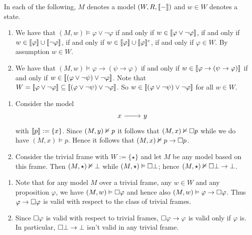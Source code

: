 \documentclass{article}
\begin{document}
\maketitle

\begin{ex}
In each of the following, $M$ denotes a model $(W,R,\llbracket{-}\rrbracket)$ and $w\in W$
denotes a state.
\begin{enumerate} 
\item We have that $(M,w)\models \varphi\lor\neg\varphi$ if and only if $w\in \llbracket\varphi\lor
\neg\varphi\rrbracket$, if and only if $w\in \llbracket\varphi\rrbracket\cup\llbracket\neg\varphi\rrbracket$,
if and only if $w\in\llbracket\varphi\rrbracket\cup\llbracket\varphi\rrbracket^c$, if and only if
$\varphi\in W$. By assumption $w\in W$.
\item We have that $(M,w)\models \varphi\to(\psi\to\varphi)$ if and only if
$w\in\llbracket\varphi\to(\psi\to\varphi)\rrbracket$ if and only if $w\in
\llbracket(\varphi\lor\neg\psi)\lor\neg\varphi\rrbracket$. Note that $W=\llbracket\varphi\lor\neg
\varphi\rrbracket\subseteq \llbracket(\varphi\lor\neg\psi)\lor\neg\varphi\rrbracket$. So
$w\in \llbracket(\varphi\lor\neg\psi)\lor\neg\varphi\rrbracket$ for all $w\in W$.
\end{enumerate}
\end{ex}

\begin{ex}
\begin{enumerate}
\item Consider the model
\begin{equation*}
\begin{tikzcd}
x \rar & y
\end{tikzcd}
\end{equation*}
with $\llbracket p\rrbracket:=\{x\}$. Since $(M,y)\nvDash p$ it follows that $(M,x)
\nvDash\square p$ while we do have $(M,x)\models p$. Hence it follows that
$(M,x)\nvDash p\to\square p$.
\item Consider the trivial frame with $W:=\{\star\}$ and let $M$
be any model based on this frame. Then $(M,\star)\nvDash\bot$ while $(M,\star)
\vDash\square\bot$; hence $(M,\star)\nvDash\square\bot\to\bot$.
\end{enumerate}
\end{ex}

\begin{ex}
\begin{enumerate}
\item Note that for any model $M$ over a trivial frame, any $w\in W$ and any proposition 
$\varphi$, we have $(M,w)\vDash\square\varphi$ and hence also $(M,w)\vDash\varphi\to\square\varphi$.
Thus $\varphi\to\square\varphi$ is valid with respect to the class of trivial frames.
\item Since $\square\varphi$ is valid with respect to trivial frames, $\square\varphi\to\varphi$
is valid only if $\varphi$ is. In particular, $\square\bot\to\bot$ isn't valid in
any trivial frame.
\end{enumerate}
\end{ex}
\end{document}
